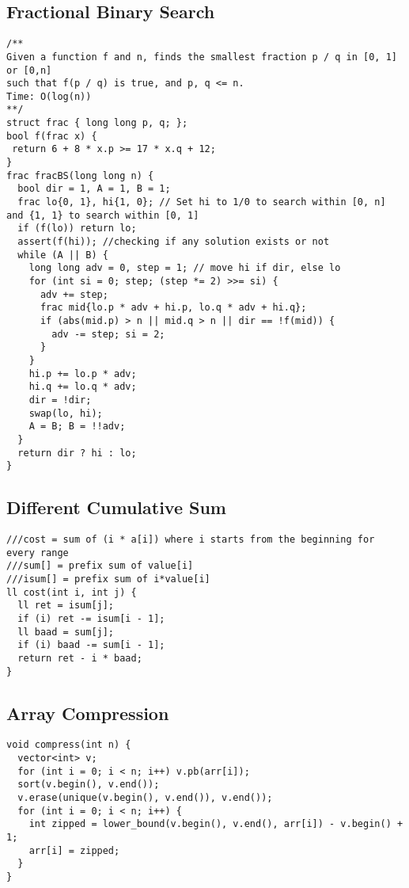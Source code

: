 \documentclass[10pt,a4paper,onesided]{article}
\begin{document}
\begin{multicols*}{3}
\subsection{Fractional Binary Search}
\begin{lstlisting}
/**
Given a function f and n, finds the smallest fraction p / q in [0, 1] or [0,n]
such that f(p / q) is true, and p, q <= n.
Time: O(log(n))
**/
struct frac { long long p, q; };
bool f(frac x) {
 return 6 + 8 * x.p >= 17 * x.q + 12;
}
frac fracBS(long long n) {
  bool dir = 1, A = 1, B = 1;
  frac lo{0, 1}, hi{1, 0}; // Set hi to 1/0 to search within [0, n] and {1, 1} to search within [0, 1]
  if (f(lo)) return lo;
  assert(f(hi)); //checking if any solution exists or not
  while (A || B) {
    long long adv = 0, step = 1; // move hi if dir, else lo
    for (int si = 0; step; (step *= 2) >>= si) {
      adv += step;
      frac mid{lo.p * adv + hi.p, lo.q * adv + hi.q};
      if (abs(mid.p) > n || mid.q > n || dir == !f(mid)) {
        adv -= step; si = 2;
      } 
    }
    hi.p += lo.p * adv;
    hi.q += lo.q * adv;
    dir = !dir;
    swap(lo, hi);
    A = B; B = !!adv;
  }
  return dir ? hi : lo;
}
\end{lstlisting}
\subsection{Different Cumulative Sum}
\begin{lstlisting}
///cost = sum of (i * a[i]) where i starts from the beginning for every range
///sum[] = prefix sum of value[i]
///isum[] = prefix sum of i*value[i]
ll cost(int i, int j) {
  ll ret = isum[j];
  if (i) ret -= isum[i - 1];
  ll baad = sum[j];
  if (i) baad -= sum[i - 1];
  return ret - i * baad;
} 
\end{lstlisting}
\subsection{Array Compression}
\begin{lstlisting}
void compress(int n) {
  vector<int> v;
  for (int i = 0; i < n; i++) v.pb(arr[i]);
  sort(v.begin(), v.end());
  v.erase(unique(v.begin(), v.end()), v.end());
  for (int i = 0; i < n; i++) {
    int zipped = lower_bound(v.begin(), v.end(), arr[i]) - v.begin() + 1;
    arr[i] = zipped;
  }
} 
\end{lstlisting}

\end{multicols*}
\end{document}
